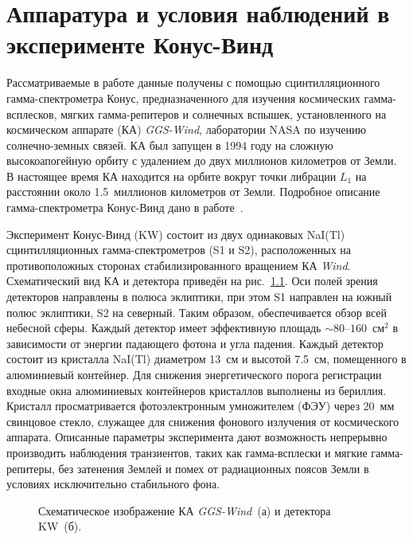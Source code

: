 \chapter{Аппаратура и условия наблюдений в эксперименте Конус-Винд}\label{KW_description}

Рассматриваемые в работе данные получены с помощью сцинтилляционного гамма-спектрометра 
Конус, предназначенного для изучения космических гамма-всплесков, мягких гамма-репитеров и солнечных вспышек,
установленного на космическом аппарате (КА) \textit{GGS-Wind}, лаборатории NASA по изучению 
солнечно-земных связей. КА был запущен в 1994 году на сложную высокоапогейную орбиту 
с удалением до двух миллионов километров от Земли. В настоящее время КА находится 
на орбите вокруг точки либрации $L_1$ на расстоянии около 1.5~миллионов километров от Земли.
Подробное описание гамма-спектрометра Конус-Винд дано в работе~\citep{Aptekar_1995SSR}.

Эксперимент Конус-Винд (KW) состоит из двух одинаковых NaI(Tl) сцинтилляционных 
гамма-спектрометров (S1 и S2), расположенных на противоположных сторонах 
стабилизированного вращением КА \textit{Wind}. 
Схематический вид КА и детектора приведён на рис.~\ref{img:KW_main_view}.
Оси полей зрения детекторов 
направлены в полюса эклиптики, при этом S1 направлен на южный полюс эклиптики, 
S2 на северный. Таким образом, обеспечивается обзор всей небесной сферы. 
Каждый детектор имеет эффективную площадь $\sim 80\textrm{--}160$~см$^2$ в 
зависимости от энергии падающего фотона и угла падения. Каждый детектор состоит 
из кристалла NaI(Tl) диаметром 13~см и высотой 7.5~см, помещенного в алюминиевый 
контейнер. Для снижения энергетического порога регистрации входные окна алюминиевых 
контейнеров кристаллов выполнены из бериллия. Кристалл просматривается фотоэлектронным 
умножителем (ФЭУ) через 20~мм свинцовое стекло, служащее для снижения фонового 
излучения от космического аппарата. Описанные параметры эксперимента дают 
возможность непрерывно производить наблюдения транзиентов, таких как гамма-всплески 
и мягкие гамма-репитеры, без затенения Землей и помех от радиационных поясов Земли 
в условиях исключительно стабильного фона. 

\begin{figure}[h]
  \begin{minipage}[h]{0.5\textwidth}
  \end{minipage}
  \hfill
  \begin{minipage}[h]{0.5\textwidth}
  \end{minipage}
  \caption[Схематическое изображение КА \textit{GGS-Wind} и детектора KW.]
  {Схематическое изображение КА \textit{GGS-Wind}~(а) и детектора KW~(б).}
  \label{img:KW_main_view}  
\end{figure}

